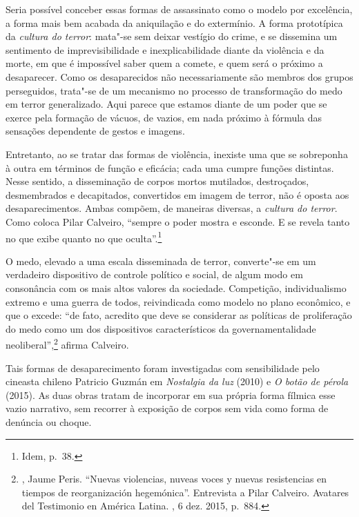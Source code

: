 Seria possível conceber essas formas de assassinato como o modelo por
excelência, a forma mais bem acabada da aniquilação e do extermínio. A
forma prototípica da \emph{cultura do terror}: mata"-se sem deixar vestígio do
crime, e se dissemina um sentimento de imprevisibilidade e
inexplicabilidade diante da violência e da morte, em que é impossível
saber quem a comete, e quem será o próximo a desaparecer. Como os
desaparecidos não necessariamente são membros dos grupos perseguidos,
trata"-se de um mecanismo no processo de transformação do medo em
terror generalizado. Aqui parece que estamos diante de um poder que se exerce pela
formação de vácuos, de vazios, em nada próximo à fórmula das sensações
dependente de gestos e imagens.

Entretanto, ao se tratar das formas de violência, inexiste uma que se
sobreponha à outra em términos de função e eficácia; cada uma cumpre
funções distintas. Nesse sentido, a disseminação de corpos mortos
mutilados, destroçados, desmembrados e decapitados, convertidos em
imagem de terror, não é oposta aos desaparecimentos. Ambas compõem, de
maneiras diversas, a \emph{cultura do terror}. Como coloca Pilar
Calveiro, ``sempre o poder mostra e esconde. E se revela tanto no que
exibe quanto no que oculta''.\footnote{Idem, p.~38.}

O medo, elevado a uma escala disseminada de terror, converte"-se em um verdadeiro
dispositivo de controle político e social, de algum modo em consonância
com os mais altos valores da sociedade. Competição,
individualismo extremo e uma guerra de todos, reivindicada como modelo no plano econômico, e que o excede: ``de fato, acredito que deve se
considerar as políticas de proliferação do medo como um dos dispositivos
característicos da governamentalidade neoliberal'',\footnote{, Jaume
  Peris. ``Nuevas violencias, nuveas voces y nuevas resistencias en
  tiempos de reorganización hegemónica''. Entrevista a Pilar Calveiro.
  Avatares del Testimonio en América Latina. {}, 6 dez.
  2015, p.~884.} afirma Calveiro.

Tais formas de desaparecimento foram investigadas com sensibilidade pelo
cineasta chileno Patricio Guzmán em \emph{Nostalgia da luz} (2010) e
\emph{O botão de pérola} (2015). As duas obras tratam de incorporar em
sua própria forma fílmica esse vazio narrativo, sem recorrer à exposição
de corpos sem vida como forma de denúncia ou choque.


\asterisc

